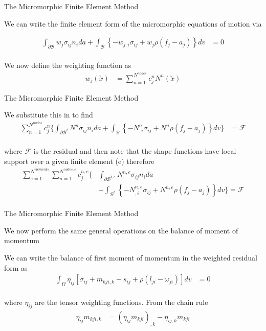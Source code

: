 \documentclass[11pt]{beamer}
\newcommand{\VEC}[1]{\utilde{#1}}
\begin{document}
\begin{frame}{The Micromorphic Finite Element Method}

We can write the finite element form of the micromorphic equations of motion via

\begin{align*}
\int_{\partial \mathcal{B}} w_j \sigma_{ij} n_i da + \int_{\mathcal{B}} \left\{- w_{j,i} \sigma_{ij} + w_j \rho \left(f_j - a_j\right) \right\} dv &= 0\\
\end{align*}

We now define the weighting function as
\begin{align*}
w_j\left(\VEC{x}\right) &= \sum_{n=1}^{N^{nodes}} c^n_j N^n \left(\VEC{x}\right)
\end{align*}

\end{frame}

\begin{frame}{The Micromorphic Finite Element Method}

We substitute this in to find
\begin{align*}
\sum_{n=1}^{N^{nodes}} c^n_j \bigg\{\int_{\partial \mathcal{B}^t} N^n \sigma_{ij} n_i da + \int_{\mathcal{B}} \left\{- N^n_{,i} \sigma_{ij} + N^n \rho \left(f_j - a_j\right) \right\} dv\bigg\} &= \mathcal{F}\\
\end{align*}

where $\mathcal{F}$ is the residual and then note that the shape functions have local support over a given finite element (e) therefore
\begin{align*}
\sum_{e=1}^{N^{elements}} \sum_{n=1}^{N^{nodes,e}} c^{n,e}_j \bigg\{&\int_{\partial \mathcal{B}^{t,e}} N^{n,e} \sigma_{ij} n_i da\\
& + \int_{\mathcal{B}^e} \left\{- N^{n,e}_{,i} \sigma_{ij} + N^{n,e} \rho \left(f_j - a_j\right) \right\} dv\bigg\} = \mathcal{F}\\
\end{align*}

\end{frame}

\begin{frame}{The Micromorphic Finite Element Method}

We now perform the same general operations on the balance of moment of momentum

We can write the balance of first moment of momentum in the weighted residual form as
\begin{align*}
\int_{\Omega} \eta_{ij} \left[\sigma_{ij} + m_{kji,k} - s_{ij} + \rho\left(l_{ji} - \omega_{ji}\right) \right] dv&= 0\\
\end{align*}

where $\eta_{ij}$ are the tensor weighting functions. From the chain rule
\begin{align*}
\eta_{ij} m_{kji,k} &= \left(\eta_{ij} m_{kji}\right)_{,k} - \eta_{ij,k} m_{kji}
\end{align*}

\end{frame}
\end{document}
